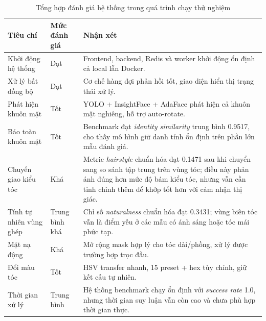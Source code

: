\documentclass[../main.tex]{subfiles}
\begin{document}
\begin{table}[H]
    \centering
    \caption{Tổng hợp đánh giá hệ thống trong quá trình chạy thử nghiệm}
    \label{tab:ch5-evaluation-summary}
    \begin{tabularx}{\textwidth}{|>{\raggedright\arraybackslash}p{3.5cm}|>{\raggedright\arraybackslash}p{3cm}|X|}
        \hline
        \textbf{Tiêu chí} & \textbf{Mức đánh giá} & \textbf{Nhận xét} \\
        \hline
        Khởi động hệ thống & Đạt & Frontend, backend, Redis và worker khởi động ổn định cả local lẫn Docker. \\
        \hline
        Xử lý bất đồng bộ & Đạt & Cơ chế hàng đợi phản hồi tốt, giao diện hiển thị trạng thái xử lý. \\
        \hline
        Phát hiện khuôn mặt & Tốt & YOLO + InsightFace + AdaFace phát hiện cả khuôn mặt nghiêng, hỗ trợ auto-rotate. \\
        \hline
        Bảo toàn khuôn mặt & Tốt & Benchmark đạt \textit{identity similarity} trung bình 0.9517, cho thấy mô hình giữ danh tính ổn định trên phần lớn mẫu đánh giá. \\
        \hline
        Chuyển giao kiểu tóc & Khá & Metric \textit{hairstyle} chuẩn hóa đạt 0.1471 sau khi chuyển sang so sánh tập trung trên vùng tóc; điều này phản ánh đúng hơn mức độ bám kiểu tóc, nhưng vẫn cần tinh chỉnh thêm để khớp tốt hơn với cảm nhận thị giác. \\
        \hline
        Tính tự nhiên vùng ghép & Trung bình khá & Chỉ số \textit{naturalness} chuẩn hóa đạt 0.3431; vùng biên tóc vẫn là điểm yếu ở các mẫu có ánh sáng hoặc tóc mái phức tạp. \\
        \hline
        Mặt nạ động & Khá & Mở rộng mask hợp lý cho tóc dài/phồng, xử lý được trường hợp trọc đầu. \\
        \hline
        Đổi màu tóc & Tốt & HSV transfer nhanh, 15 preset + hex tùy chỉnh, giữ kết cấu tự nhiên. \\
        \hline
        Thời gian xử lý & Trung bình & Hệ thống benchmark chạy ổn định với \textit{success rate} 1.0, nhưng thời gian suy luận vẫn còn cao và chưa phù hợp thời gian thực. \\
        \hline
    \end{tabularx}
\end{table}
\end{document}

